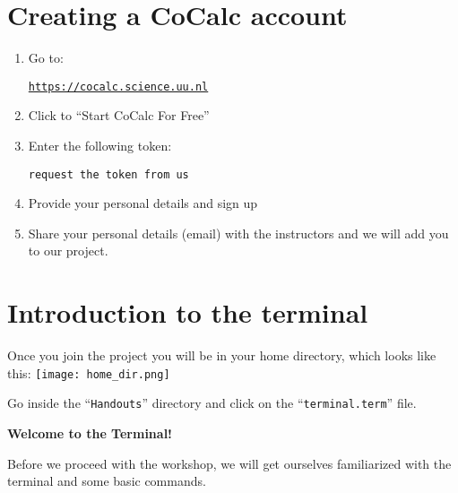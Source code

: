 \documentclass[11pt]{article}
\begin{document}
\section*{Creating a CoCalc account}

\begin{enumerate}
\item Go to:

\href{https://cocalc.science.uu.nl}{\texttt{https://cocalc.science.uu.nl}}

\item Click to ``Start CoCalc For Free''

\item Enter the following token:

\texttt {request the token from us}

\item Provide your personal details and sign up

\item Share your personal details (email) with the instructors and we will add you to our project. 

\end{enumerate}

\section*{Introduction to the terminal}

Once you join the project you will be in your home directory, which looks like this:
\texttt{[image: home\_dir.png]}

Go inside the ``\texttt{Handouts}'' directory and click on the ``\texttt{terminal.term}'' file. 

\textbf{Welcome to the Terminal!}

Before we proceed with the workshop, we will get ourselves familiarized with the terminal and some basic commands. 
\end{document}
